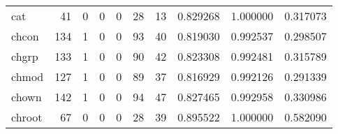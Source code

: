 \begin{longtable}{lrrrrrrrrr}
cat       &                                        41 &                                                  0 &                                                  0 &                                                  0 &                                                 28 &                                                 13 &                                           0.829268 &                               1.000000 &                             0.317073 \\
chcon     &                                       134 &                                                  1 &                                                  0 &                                                  0 &                                                 93 &                                                 40 &                                           0.819030 &                               0.992537 &                             0.298507 \\
chgrp     &                                       133 &                                                  1 &                                                  0 &                                                  0 &                                                 90 &                                                 42 &                                           0.823308 &                               0.992481 &                             0.315789 \\
chmod     &                                       127 &                                                  1 &                                                  0 &                                                  0 &                                                 89 &                                                 37 &                                           0.816929 &                               0.992126 &                             0.291339 \\
chown     &                                       142 &                                                  1 &                                                  0 &                                                  0 &                                                 94 &                                                 47 &                                           0.827465 &                               0.992958 &                             0.330986 \\
chroot    &                                        67 &                                                  0 &                                                  0 &                                                  0 &                                                 28 &                                                 39 &                                           0.895522 &                               1.000000 &                             0.582090 \\

\end{longtable}
